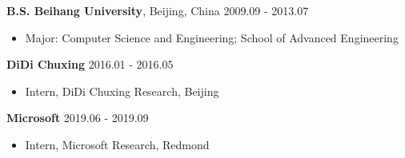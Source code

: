 \documentclass[11pt, a4paper]{article}
\begin{document}
\textbf{B.S. Beihang University}, Beijing, China \hfill 2009.09 - 2013.07
	\begin{itemize}
	\item Major: Computer Science and Engineering; School of Advanced Engineering
	\end{itemize}

\textbf{DiDi Chuxing} \hfill 2016.01 - 2016.05
	\begin{itemize}
	\item Intern, DiDi Chuxing Research, Beijing 
	\end{itemize}
\textbf{Microsoft} \hfill 2019.06 - 2019.09
	\begin{itemize}
	\item Intern, Microsoft Research, Redmond 
	\end{itemize}


\end{document}
